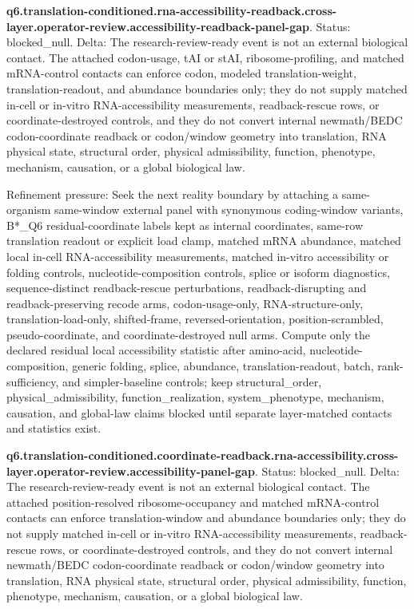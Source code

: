 \textbf{q6.translation-conditioned.rna-accessibility-readback.cross-layer.operator-review.accessibility-readback-panel-gap}. Status: blocked\_null. Delta: The research-review-ready event is not an external biological contact. The attached codon-usage, tAI or stAI, ribosome-profiling, and matched mRNA-control contacts can enforce codon, modeled translation-weight, translation-readout, and abundance boundaries only; they do not supply matched in-cell or in-vitro RNA-accessibility measurements, readback-rescue rows, or coordinate-destroyed controls, and they do not convert internal newmath/BEDC codon-coordinate readback or codon/window geometry into translation, RNA physical state, structural order, physical admissibility, function, phenotype, mechanism, causation, or a global biological law.

Refinement pressure: Seek the next reality boundary by attaching a same-organism same-window external panel with synonymous coding-window variants, B*\_Q6 residual-coordinate labels kept as internal coordinates, same-row translation readout or explicit load clamp, matched mRNA abundance, matched local in-cell RNA-accessibility measurements, matched in-vitro accessibility or folding controls, nucleotide-composition controls, splice or isoform diagnostics, sequence-distinct readback-rescue perturbations, readback-disrupting and readback-preserving recode arms, codon-usage-only, RNA-structure-only, translation-load-only, shifted-frame, reversed-orientation, position-scrambled, pseudo-coordinate, and coordinate-destroyed null arms. Compute only the declared residual local accessibility statistic after amino-acid, nucleotide-composition, generic folding, splice, abundance, translation-readout, batch, rank-sufficiency, and simpler-baseline controls; keep structural\_order, physical\_admissibility, function\_realization, system\_phenotype, mechanism, causation, and global-law claims blocked until separate layer-matched contacts and statistics exist.

\textbf{q6.translation-conditioned.coordinate-readback.rna-accessibility.cross-layer.operator-review.accessibility-panel-gap}. Status: blocked\_null. Delta: The research-review-ready event is not an external biological contact. The attached position-resolved ribosome-occupancy and matched mRNA-control contacts can enforce translation-window and abundance boundaries only; they do not supply matched in-cell or in-vitro RNA-accessibility measurements, readback-rescue rows, or coordinate-destroyed controls, and they do not convert internal newmath/BEDC codon-coordinate readback or codon/window geometry into translation, RNA physical state, structural order, physical admissibility, function, phenotype, mechanism, causation, or a global biological law.

